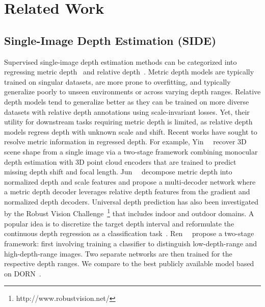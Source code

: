 \documentclass[10pt,twocolumn,letterpaper]{article}
\begin{document}
\section{Related Work}
\label{sec:related}
\subsection{Single-Image Depth Estimation (SIDE)}
Supervised single-image depth estimation methods can be categorized into regressing metric depth~\cite{SIDEreviewMERTAN2022103441, jun2022depth, bhat2021adabins,bhat2022localbins, yuan2022new, li2022binsformer} and relative depth~\cite{lee2019monocular, Ranftl2020MiDaS, Ranftl_2021_ICCV_DPT, SIDEreviewMERTAN2022103441}. Metric depth models are typically trained on singular datasets, are more prone to overfitting, and typically generalize poorly to unseen environments or across varying depth ranges. Relative depth models tend to generalize better as they can be trained on more diverse datasets with relative depth annotations using scale-invariant losses. Yet, their utility for downstream tasks requiring metric depth is limited, as relative depth models regress depth with unknown scale and shift. Recent works have sought to resolve metric information in regressed depth. For example, Yin~\etal~\cite{yin2021learning} recover 3D scene shape from a single image via a two-stage framework combining monocular depth estimation with 3D point cloud encoders that are trained to predict missing depth shift and focal length. Jun~\etal~\cite{jun2022depth} decompose metric depth into normalized depth and scale features and propose a multi-decoder network where a metric depth decoder leverages relative depth features from the gradient and normalized depth decoders.
Universal depth prediction has also been investigated by the Robust Vision Challenge~\footnote{http://www.robustvision.net/} that includes indoor and outdoor domains. A popular idea is to discretize the target depth interval and reformulate the continuous depth regression as a classification task~\cite{Fu2018DeepOR,DABC_10.1007/978-3-030-20870-7_41,LI2018328CSWS,DSSIDERen2019DeepRS}. Ren~\etal~\cite{DSSIDERen2019DeepRS} propose a two-stage framework: first involving training a classifier to distinguish low-depth-range and high-depth-range images. Two separate networks are then trained for the respective depth ranges. We compare to the best publicly available model based on DORN~\cite{Fu2018DeepOR}.
\end{document}
